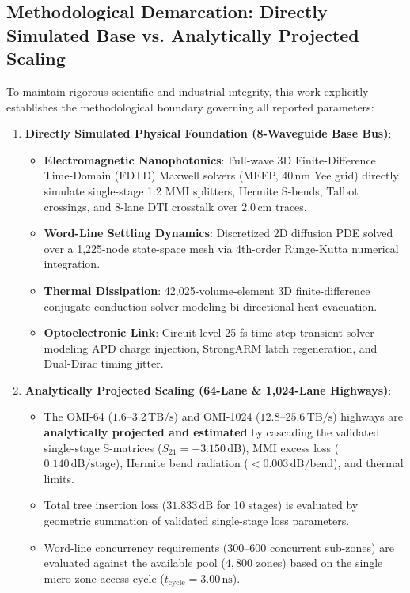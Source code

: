 \documentclass[journal]{IEEEtran}
\begin{document}
\subsection{Methodological Demarcation: Directly Simulated Base vs. Analytically Projected Scaling}
To maintain rigorous scientific and industrial integrity, this work explicitly establishes the methodological boundary governing all reported parameters:
\begin{enumerate}
    \item \textbf{Directly Simulated Physical Foundation (8-Waveguide Base Bus)}:
    \begin{itemize}
        \item \textbf{Electromagnetic Nanophotonics}: Full-wave 3D Finite-Difference Time-Domain (FDTD) Maxwell solvers (MEEP, $40\,\text{nm}$ Yee grid) directly simulate single-stage 1:2 MMI splitters, Hermite S-bends, Talbot crossings, and 8-lane DTI crosstalk over $2.0\,\text{cm}$ traces.
        \item \textbf{Word-Line Settling Dynamics}: Discretized 2D diffusion PDE solved over a 1,225-node state-space mesh via 4th-order Runge-Kutta numerical integration.
        \item \textbf{Thermal Dissipation}: 42,025-volume-element 3D finite-difference conjugate conduction solver modeling bi-directional heat evacuation.
        \item \textbf{Optoelectronic Link}: Circuit-level 25-fs time-step transient solver modeling APD charge injection, StrongARM latch regeneration, and Dual-Dirac timing jitter.
    \end{itemize}
    \item \textbf{Analytically Projected Scaling (64-Lane \& 1,024-Lane Highways)}:
    \begin{itemize}
        \item The OMI-64 ($1.6\text{--}3.2\,\text{TB/s}$) and OMI-1024 ($12.8\text{--}25.6\,\text{TB/s}$) highways are \textbf{analytically projected and estimated} by cascading the validated single-stage S-matrices ($S_{21} = -3.150\,\text{dB}$), MMI excess loss ($0.140\,\text{dB/stage}$), Hermite bend radiation ($<0.003\,\text{dB/bend}$), and thermal limits.
        \item Total tree insertion loss ($31.833\,\text{dB}$ for 10 stages) is evaluated by geometric summation of validated single-stage loss parameters.
        \item Word-line concurrency requirements ($300\text{--}600$ concurrent sub-zones) are evaluated against the available pool ($4,800$ zones) based on the single micro-zone access cycle ($t_{\text{cycle}} = 3.00\,\text{ns}$).
    \end{itemize}
\end{enumerate}
\end{document}
